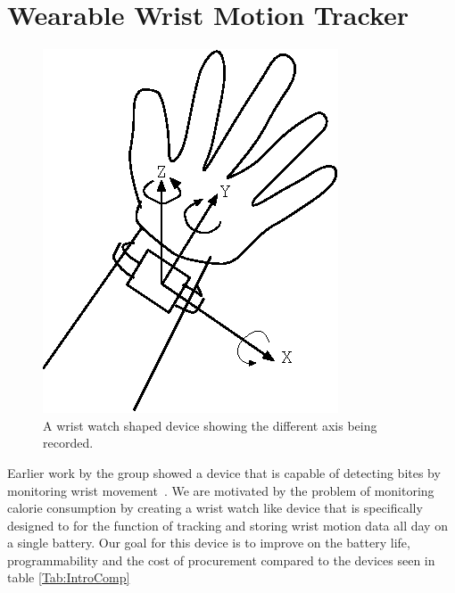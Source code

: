 \section{Wearable Wrist Motion Tracker}
\label{Sec:WearbleTracker}
\begin{figure}
\begin{center}
\includegraphics{images/HandAxis.eps}
\caption{A wrist watch shaped device showing the different axis being recorded.}
\label{fig:HandAxis}
\end{center}
\end{figure}
Earlier work by the group showed a device that is capable of
detecting bites by monitoring wrist movement~\cite{drennan2010assessment}.
We are motivated by the problem of monitoring calorie consumption by
creating a wrist watch like device that is specifically designed
to for the function of tracking and storing wrist motion data all day
on a single battery. Our goal for this device is to improve on the
battery life, programmability and the cost of procurement compared to
the devices seen in table \ref{Tab:IntroComp}
